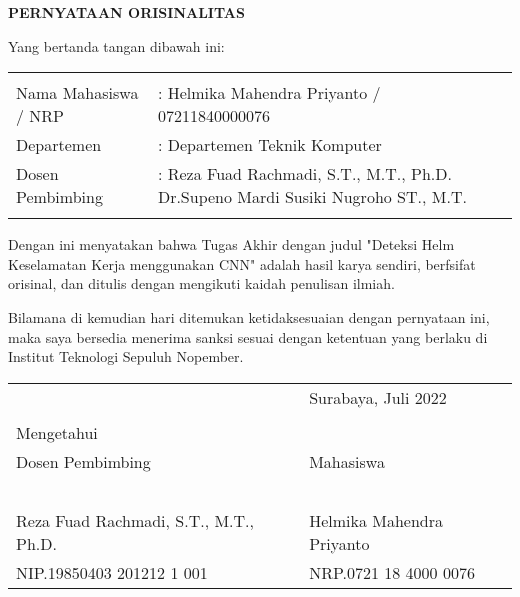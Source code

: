 \begin{center}
  \large
  \textbf{PERNYATAAN ORISINALITAS}
\end{center}

\thispagestyle{empty}

\vspace{2ex}


\noindent Yang bertanda tangan dibawah ini:

\noindent\begin{tabularx}{\textwidth}{X X l}
  & \\
  Nama Mahasiswa / NRP &: Helmika Mahendra Priyanto / 07211840000076 \\
  Departemen &: Departemen Teknik Komputer\\
  Dosen Pembimbing &: Reza Fuad Rachmadi, S.T., M.T., Ph.D.
  Dr.Supeno Mardi Susiki Nugroho ST., M.T. \\
  & \\
\end{tabularx}

Dengan ini menyatakan bahwa Tugas Akhir dengan judul "Deteksi Helm Keselamatan Kerja menggunakan CNN" adalah hasil karya sendiri, berfsifat orisinal, dan ditulis dengan mengikuti kaidah penulisan ilmiah.

Bilamana di kemudian hari ditemukan ketidaksesuaian dengan pernyataan ini, maka saya bersedia menerima sanksi sesuai dengan ketentuan yang berlaku di Institut Teknologi Sepuluh Nopember.

\vspace{8ex}

\noindent\begin{tabularx}{\textwidth}{X l}
  & Surabaya, Juli 2022\\
  & \\
  Mengetahui & \\
  Dosen Pembimbing & Mahasiswa\\
  & \\
  & \\
  & \\
  & \\
  & \\
  Reza Fuad Rachmadi, S.T., M.T., Ph.D. & Helmika Mahendra Priyanto \\
  NIP.19850403 201212 1 001 & NRP.0721 18 4000 0076 \\
\end{tabularx}